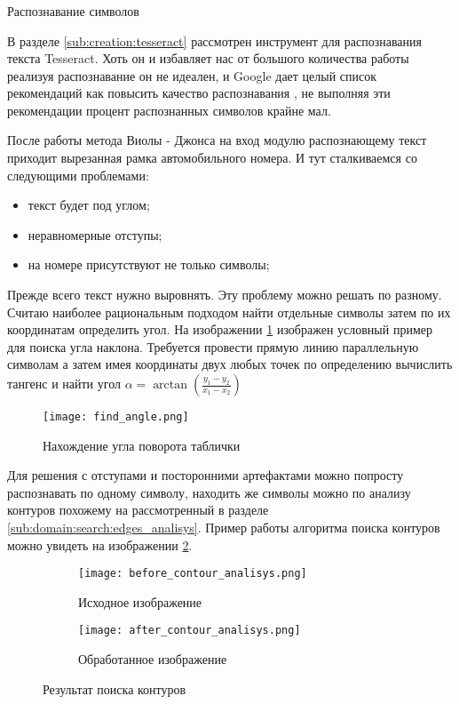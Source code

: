 \subsubsection{}
Распознавание символов

В разделе \ref{sub:creation:tesseract} рассмотрен инструмент для распознавания текста Tesseract. Хоть он и избавляет нас от большого количества работы реализуя распознавание он не идеален, и Google дает целый список рекомендаций как повысить качество распознавания \cite{tesseract_impruvment}, не выполняя эти рекомендации процент распознанных символов крайне мал.

После работы метода Виолы - Джонса на вход модулю распознающему текст приходит вырезанная рамка автомобильного номера. И тут сталкиваемся со следующими проблемами:
\begin{itemize}
	\item текст будет под углом;
	\item неравномерные отступы;
	\item на номере присутствуют не только символы;
\end{itemize}

Прежде всего текст нужно выровнять. Эту проблему можно решать по разному. Считаю наиболее рациональным подходом найти отдельные символы затем по их координатам определить угол. На изображении \ref{fig:funcreq:analisys} изображен условный пример для поиска угла наклона. Требуется провести прямую линию параллельную символам а затем имея координаты двух любых точек по определению вычислить тангенс и найти угол $\alpha = \arctan(\frac{y_1 - y_2}{x_1 - x_2})$

\begin{figure}[ht]
\centering
    \texttt{[image: find\_angle.png]}  
    \caption{Нахождение угла поворота таблички}
    \label{fig:funcreq:analisys}
\end{figure}

Для решения с отступами и посторонними артефактами можно попросту распознавать по одному символу, находить же символы можно по анализу контуров похожему на рассмотренный в разделе \ref{sub:domain:search:edges_analisys}. Пример работы алгоритма поиска контуров можно увидеть на изображении \ref{fig:funcreq:analisys:contour}.

\begin{figure}[ht]
\centering
  \begin{subfigure}[b]{0.48\textwidth} 
    \centering
    \texttt{[image: before\_contour\_analisys.png]}  
    \caption{Исходное изображение}
  \end{subfigure}
  \begin{subfigure}[b]{0.48\textwidth} 
    \centering
    \texttt{[image: after\_contour\_analisys.png]}  
    \caption{Обработанное изображение}
  \end{subfigure}
  \caption{Результат поиска контуров}
  \label{fig:funcreq:analisys:contour}
\end{figure}

